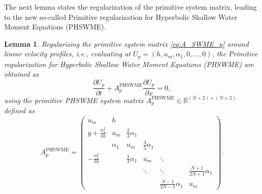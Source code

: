 \documentclass[a4paper, 11pt]{article}
\newtheorem{lemma}{Lemma}
\begin{document}
The next lemma states the regularization of the primitive system matrix, leading to the new so-called Primitive regularization for Hyperbolic Shallow Water Moment Equations (PHSWME).
\begin{lemma}\label{lemma:APHSWME_p}
    Regularizing the primitive system matrix \eqref{eq:A_SWME_p} around linear velocity profiles, i.e., evaluating at $U_{p}=\left(h,u_m,\alpha_1, 0, \ldots, 0\right)$, the Primitive regularization for Hyperbolic Shallow Water Moment Equations (PHSWME) are obtained as
    \begin{equation}\label{eq:PHSWME_p}
        \frac{\partial U_{p}}{\partial t} + A^{\textrm{PHSWME}}_{p} \frac{\partial U_{p}}{\partial x} = 0,
    \end{equation}
    using the primitive PHSWME system matrix $A^{\textrm{PHSWME}}_{p} \in \mathbb{R}^{(N+2)\times(N+2)}$ defined as
    \begin{equation}\label{eq:A_PHSWME_p}
        A^{\textrm{PHSWME}}_{p} =
        \left(\begin{array}{cccccc}
        u_m & h &  &  &  &  \\
        g + \frac{\alpha_1^2}{3 h} & u_m & \frac{2}{3} \alpha_1 &  &  &  \\
         & \alpha_1 & u_m & \frac{3}{5} \alpha_1 & &\\
        -\frac{\alpha_1^2}{3h} &   & \frac{1}{3}\alpha_1 & u_m & \ddots & \\
         &  &  & \ddots & \ddots & \frac{N+1}{2N+1}\alpha_1 \\
         &  &  &  & \frac{N-1}{2N-1}\alpha_1 & u_m
        \end{array}\right).
    \end{equation}
\end{lemma}
\end{document}
